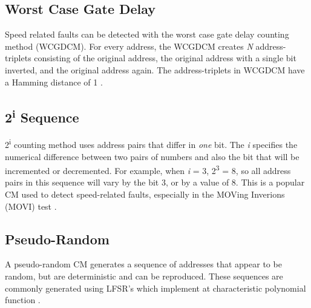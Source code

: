 \subsection{Worst Case Gate Delay}
Speed related faults can be detected with the worst case gate delay counting method (WCGDCM).  For every address, the WCGDCM creates \textit{N} address-triplets consisting of the original address, the original address with a single bit inverted, and the original address again.  The address-triplets in WCGDCM have a Hamming distance of 1 \cite{5359299}.

\subsection{2\textsuperscript{i} Sequence}
2\textsuperscript{i} counting method uses address pairs that differ in \textit{one} bit.  The \textit{i} specifies the numerical difference between two pairs of numbers and also the bit that will be incremented or decremented.  For example, when \textit{i} = 3, 2\textsuperscript{3} = 8, so all address pairs in this sequence will vary by the bit 3, or by a value of 8.  This is a popular CM used to detect speed-related faults, especially in the MOVing Inverions (MOVI) test \cite{5941430}.

\subsection{Pseudo-Random}
A pseudo-random CM generates a sequence of addresses that appear to be random, but are deterministic and can be reproduced.  These sequences are commonly generated using LFSR's which implement at characteristic polynomial function \cite{VanDeGoor1991}.


